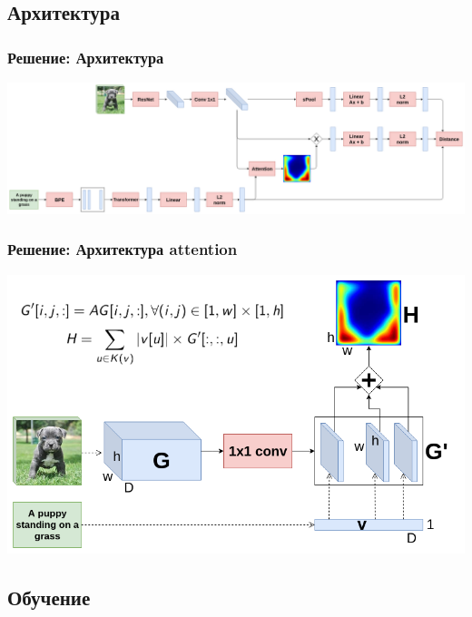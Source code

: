 \documentclass{beamer}
\begin{document}
\subsection{Архитектура}

\begin{frame}
	\frametitle{Решение: Архитектура}
	\centerline{\includegraphics[scale=0.18]{images/architecture.png}}
\end{frame}

\begin{frame}
	\frametitle{Решение: Архитектура attention}
	\centerline{\includegraphics[scale=0.4]{images/architecture_attention.png}}
\end{frame}

\subsection{Обучение}
\end{document}

